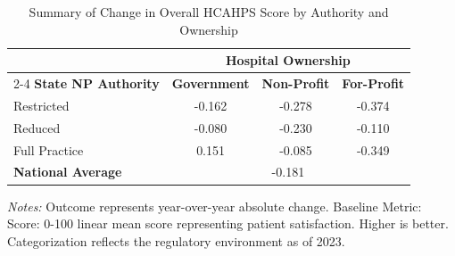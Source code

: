 \begin{table}[htbp]
    \centering
    \caption{Summary of Change in Overall HCAHPS Score by Authority and Ownership}
    \label{tab:d_hcahps_100_score_own}
    \vspace{0.2cm}
    \begin{tabular}{lccc}
        \toprule
        & \multicolumn{3}{c}{\textbf{Hospital Ownership}} \\
        \cmidrule(lr){2-4}
        \textbf{State NP Authority} & \textbf{Government} & \textbf{Non-Profit} & \textbf{For-Profit} \\
        \midrule
        Restricted & -0.162 & -0.278 & -0.374 \\
        Reduced & -0.080 & -0.230 & -0.110 \\
        Full Practice & 0.151 & -0.085 & -0.349 \\
        \midrule
        \textbf{National Average} & \multicolumn{3}{c}{-0.181} \\
        \bottomrule
    \end{tabular}
    \vspace{0.1cm}
    \begin{minipage}{0.85\textwidth}
        \footnotesize \textit{Notes:} Outcome represents year-over-year absolute change. Baseline Metric: Score: 0-100 linear mean score representing patient satisfaction. Higher is better. Categorization reflects the regulatory environment as of 2023.
    \end{minipage}
\end{table}